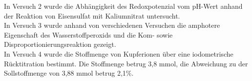 \documentclass[12pt]{scrartcl} %
\begin{document}
In Versuch 2 wurde die Abhängigkeit des Redoxpotenzial vom pH-Wert anhand der Reaktion von Eisensulfat mit Kaliumnitrat untersucht.\\

In Versuch 3 wurde anhand von verschiedenen Versuchen die amphotere Eigenschaft des Wasserstoffperoxids und die Kom- sowie Disproportionierungsreaktion gezeigt.\\

In Versuch 4 wurde die Stoffmenge von Kupferionen über eine iodometrische Rücktitration bestimmt. Die Stoffmenge betrug 3,8 mmol, die Abweichung zu der Sollstoffmenge von 3,88 mmol betrug 2,1\%.

\newpage
\renewcommand{\thepage}{\roman{page}}\setcounter{page}{1}
\printbibliography
\end{document}
